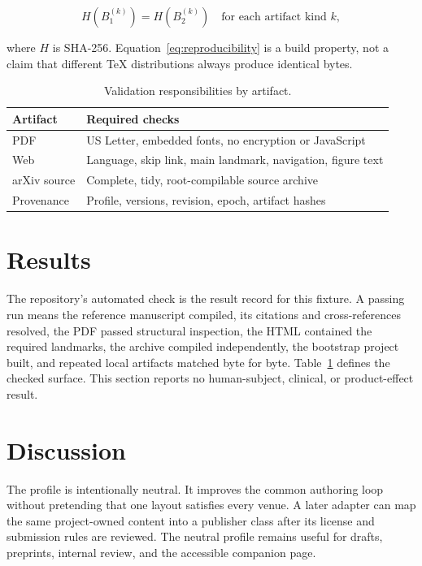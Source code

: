 \begin{equation}
  H(B_1^{(k)}) = H(B_2^{(k)}) \quad \text{for each artifact kind } k,
  \label{eq:reproducibility}
\end{equation}

where $H$ is SHA-256. Equation~\eqref{eq:reproducibility} is a build property,
not a claim that different TeX distributions always produce identical bytes.

\begin{table}[htbp]
  \centering
  \caption{Validation responsibilities by artifact.}
  \label{tab:checks}
  \begin{tabular}{@{}ll@{}}
    \toprule
    Artifact & Required checks \\
    \midrule
    PDF & US Letter, embedded fonts, no encryption or JavaScript \\
    Web & Language, skip link, main landmark, navigation, figure text \\
    arXiv source & Complete, tidy, root-compilable source archive \\
    Provenance & Profile, versions, revision, epoch, artifact hashes \\
    \bottomrule
  \end{tabular}
\end{table}

\section{Results}

The repository's automated check is the result record for this fixture. A
passing run means the reference manuscript compiled, its citations and
cross-references resolved, the PDF passed structural inspection, the HTML
contained the required landmarks, the archive compiled independently, the
bootstrap project built, and repeated local artifacts matched byte for byte.
Table~\ref{tab:checks} defines the checked surface. This section reports no
human-subject, clinical, or product-effect result.

\section{Discussion}

The profile is intentionally neutral. It improves the common authoring loop
without pretending that one layout satisfies every venue. A later adapter can
map the same project-owned content into a publisher class after its license and
submission rules are reviewed. The neutral profile remains useful for drafts,
preprints, internal review, and the accessible companion page.

